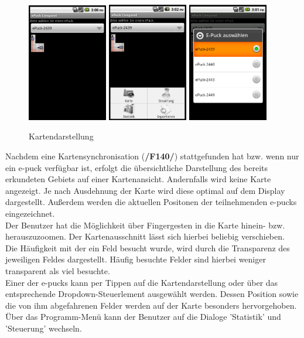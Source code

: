 \documentclass[10pt,a4paper]{article}
\begin{document}
			\begin{figure}[h]
				  \centering
				\includegraphics[width=3.5cm]{screenshots_neu/map.png}
				\includegraphics[width=3.5cm]{screenshots_neu/map_menu.png}
				\includegraphics[width=3.5cm]{screenshots_neu/map_auswahl.png}
  				\caption{Kartendarstellung}
  			\end{figure}						
			
			Nachdem eine Kartensynchronisation (\textbf{/F140/}) stattgefunden hat bzw. wenn nur ein e-puck verfügbar ist, erfolgt die
			übersichtliche Darstellung des bereits erkundeten Gebiets auf einer Kartenansicht. Andernfalls wird keine Karte angezeigt.
			Je nach Ausdehnung der Karte wird diese optimal auf dem Display dargestellt. Außerdem werden die aktuellen Positonen der
			teilnehmenden e-pucks eingezeichnet. \\	
			Der Benutzer hat die Möglichkeit über Fingergesten in die Karte hinein- bzw. herauszuzoomen. Der Kartenausschnitt lässt sich
			hierbei beliebig verschieben. \\		
			Die Häufigkeit mit der ein Feld besucht wurde, wird durch die Transparenz des jeweiligen Feldes dargestellt. Häufig besuchte
			Felder sind hierbei weniger transparent als viel besuchte. \\
			Einer der e-pucks kann per Tippen auf die Kartendarstellung oder über das entsprechende Dropdown-Steuerlement ausgewählt
			werden. Dessen Position sowie die von ihm abgefahrenen Felder werden auf der Karte besonders hervorgehoben.\\
			Über das Programm-Menü kann der Benutzer auf die Dialoge 'Statistik' und 'Steuerung' wechseln.
\end{document}

